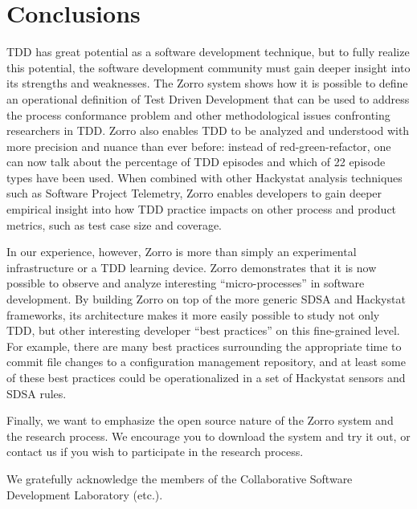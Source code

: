 \documentclass[smallextended]{svjour3}     %
\begin{document}
\section{Conclusions}
\label{sec:conclusions}

TDD has great potential as a software development technique, but to fully
realize this potential, the software development community must gain deeper
insight into its strengths and weaknesses.  The Zorro system shows how it
is possible to define an operational definition of Test Driven Development
that can be used to address the process conformance problem and other
methodological issues confronting researchers in TDD.  Zorro also enables
TDD to be analyzed and understood with more precision and nuance than ever
before: instead of red-green-refactor, one can now talk about the
percentage of TDD episodes and which of 22 episode types have been used.
When combined with other Hackystat analysis techniques such as Software
Project Telemetry, Zorro enables developers to gain deeper empirical
insight into how TDD practice impacts on other process and product metrics,
such as test case size and coverage.

In our experience, however, Zorro is more than simply an experimental
infrastructure or a TDD learning device.  Zorro demonstrates that it is now
possible to observe and analyze interesting ``micro-processes'' in software
development.  By building Zorro on top of the more generic SDSA and
Hackystat frameworks, its architecture makes it more easily possible to
study not only TDD, but other interesting developer ``best practices'' on
this fine-grained level.  For example, there are many best practices
surrounding the appropriate time to commit file changes to a configuration
management repository, and at least some of these best practices could be
operationalized in a set of Hackystat sensors and SDSA rules. 

Finally, we want to emphasize the open source nature of the Zorro system and 
the research process.   We encourage you to download the system and try it out,
or contact us if you wish to participate in the research process. 

\begin{acknowledgements}
We gratefully acknowledge the members of the Collaborative Software Development Laboratory (etc.).
\end{acknowledgements}


\end{document}
